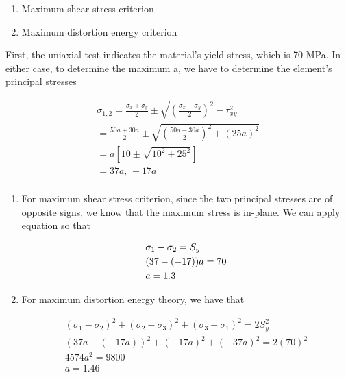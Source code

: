 \documentclass[a4paper,openany,nobib]{tufte-book}
\begin{document}
\begin{enumerate}
\item Maximum shear stress criterion

\item Maximum distortion energy criterion
\end{enumerate}

First, the uniaxial test indicates the material's yield stress, which is
70 MPa. In either case, to determine the maximum a, we have to determine
the element's principal stresses

$$\begin{gathered}
      \sigma_{1,2} = \frac{\sigma_x + \sigma_y}{2} \pm \sqrt {\left( \frac{\sigma_x - \sigma_y}{2} \right)^2 - \tau _{xy}^2}  \\ 
      = \frac{50a + 30a}{2} \pm \sqrt {\left( \frac{50a - 30a}{2} \right)^2 + (25a)^2}  \\ 
      = a\left[ 10 \pm \sqrt {10^2 + 25^2} \right] \\ 
      = 37a \text{, } - 17a \\ 
    \end{gathered}$$

\begin{enumerate}
\item For maximum shear stress criterion, since the two principal stresses
are of opposite signs, we know that the maximum stress is in-plane.
We can apply equation so that

$$\begin{gathered}
           \sigma_1 - \sigma_2 = S_y \hfill \\
           (37 - ( - 17))a = 70 \hfill \\
           a = 1.3 \hfill \\ 
         \end{gathered}$$

\item For maximum distortion energy theory, we have that

$$\begin{gathered}
           (\sigma_1 - \sigma_2)^2 + (\sigma_2 - \sigma_3)^2 + (\sigma_3 - \sigma_1)^2 = 2S_y^2 \\ 
           (37a - ( - 17a))^2 + ( - 17a)^2 + ( - 37a)^2 = 2(70)^2 \\ 
           4574a^2 = 9800 \\ 
           a = 1.46 \\ 
         \end{gathered}$$
\end{enumerate}
\end{document}
